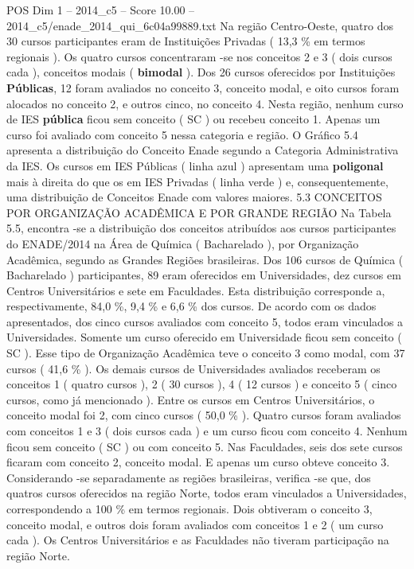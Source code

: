 \begin{textsample}{POS Dim 1 – 2014\_c5 – Score 10.00 – 2014\_c5/enade\_2014\_qui\_6c04a99889.txt}
Na região Centro-Oeste, quatro dos 30 cursos participantes eram de Instituições Privadas ( 13,3 \% em termos regionais ).
Os quatro cursos concentraram -se nos conceitos 2 e 3 ( dois cursos cada ), conceitos modais ( \textbf{bimodal} ).
Dos 26 cursos oferecidos por Instituições \textbf{Públicas}, 12 foram avaliados no conceito 3, conceito modal, e oito cursos foram alocados no conceito 2, e outros cinco, no conceito 4.
Nesta região, nenhum curso de IES \textbf{pública} ficou sem conceito ( SC ) ou recebeu conceito 1.
Apenas um curso foi avaliado com conceito 5 nessa categoria e região.
O Gráfico 5.4 apresenta a distribuição do Conceito Enade segundo a Categoria Administrativa da IES.
Os cursos em IES Públicas ( linha azul ) apresentam uma \textbf{poligonal} mais à direita do que os em IES Privadas ( linha verde ) e, consequentemente, uma distribuição de Conceitos Enade com valores maiores. 5.3 CONCEITOS POR ORGANIZAÇÃO ACADÊMICA E POR GRANDE REGIÃO Na Tabela 5.5, encontra -se a distribuição dos conceitos atribuídos aos cursos participantes do ENADE/2014 na Área de Química ( Bacharelado ), por Organização Acadêmica, segundo as Grandes Regiões brasileiras.
Dos 106 cursos de Química ( Bacharelado ) participantes, 89 eram oferecidos em Universidades, dez cursos em Centros Universitários e sete em Faculdades.
Esta distribuição corresponde a, respectivamente, 84,0 \%, 9,4 \% e 6,6 \% dos cursos.
De acordo com os dados apresentados, dos cinco cursos avaliados com conceito 5, todos eram vinculados a Universidades.
Somente um curso oferecido em Universidade ficou sem conceito ( SC ).
Esse tipo de Organização Acadêmica teve o conceito 3 como modal, com 37 cursos ( 41,6 \% ).
Os demais cursos de Universidades avaliados receberam os conceitos 1 ( quatro cursos ), 2 ( 30 cursos ), 4 ( 12 cursos ) e conceito 5 ( cinco cursos, como já mencionado ).
Entre os cursos em Centros Universitários, o conceito modal foi 2, com cinco cursos ( 50,0 \% ).
Quatro cursos foram avaliados com conceitos 1 e 3 ( dois cursos cada ) e um curso ficou com conceito 4.
Nenhum ficou sem conceito ( SC ) ou com conceito 5.
Nas Faculdades, seis dos sete cursos ficaram com conceito 2, conceito modal.
E apenas um curso obteve conceito 3.
Considerando -se separadamente as regiões brasileiras, verifica -se que, dos quatros cursos oferecidos na região Norte, todos eram vinculados a Universidades, correspondendo a 100 \% em termos regionais.
Dois obtiveram o conceito 3, conceito modal, e outros dois foram avaliados com conceitos 1 e 2 ( um curso cada ).
Os Centros Universitários e as Faculdades não tiveram participação na região Norte.

\end{textsample}
